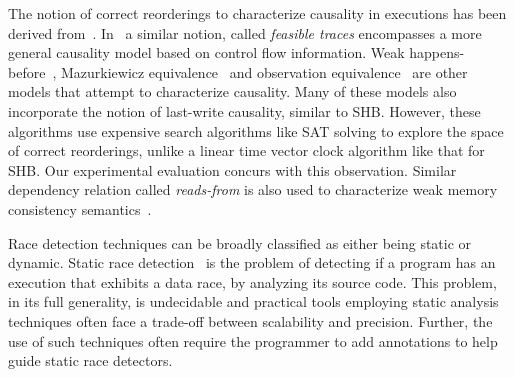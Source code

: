 
The notion of correct reorderings to characterize causality in
executions has been derived from~\cite{cp2012,wcp2017}.
In~\cite{rv2014} a similar notion, called \emph{feasible traces}
encompasses a more general causality model based on control flow information.
Weak happens-before~\cite{sen2005detecting},  
Mazurkiewicz equivalence~\cite{mazurkiewicz1987,Abdulla14} 
and observation equivalence~\cite{Chalupa2017} are other models
that attempt to characterize causality.
Many of these models also incorporate the notion of last-write causality, similar to SHB.
However, these algorithms use expensive search algorithms like SAT solving
to explore the space of correct reorderings, unlike
a linear time vector clock algorithm like that for SHB.
Our experimental evaluation concurs with this observation.
Similar dependency relation called \emph{reads-from} is 
also used to characterize weak memory consistency 
semantics~\cite{Alglave:2014:HCM:2633904.2627752,HuangTSO16}. 

Race detection techniques can be broadly
classified as either being
static or dynamic.
Static race detection~\cite{Naik:2006:ESR:1133255.1134018,pratikakis11locksmith,Radoi:2013:PSR:2483760.2483765,racerx,voung2007relay,heisenbugs,Yahav:2001:VSP:373243.360206,echo}
is the problem of detecting if a program has an execution that exhibits
a data race, by analyzing its source code.
This problem, in its full generality, is undecidable
and practical tools employing static analysis techniques often face
a trade-off between scalability and precision.
Further, the use of such techniques often require the
programmer to add annotations to help guide static race detectors.

